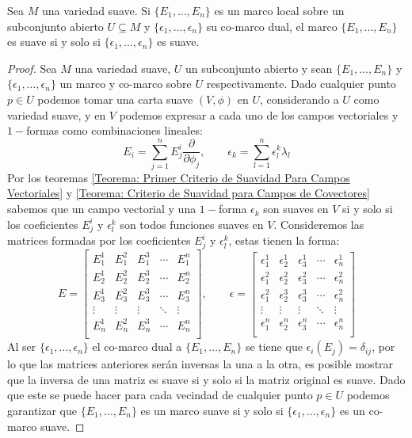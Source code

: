 \begin{lemma}
	Sea $M$ una variedad suave. Si $\{E_1,\ldots,E_n\}$ es un marco local sobre un subconjunto abierto $U \subseteq M$ y $\{\epsilon_1,\ldots,\epsilon_n\}$ su co-marco dual, el marco $\{E_1,\ldots,E_n\}$ es suave si y solo si $\{\epsilon_1,\ldots, \epsilon_n\}$ es suave.
\end{lemma}

\begin{proof}
	Sea $M$ una variedad suave, $U$ un subconjunto abierto y sean $\{E_1, \ldots, E_n\}$ y $\{\epsilon_1,\ldots,\epsilon_n\}$ un marco y co-marco sobre $U$ respectivamente. Dado cualquier punto $p \in U$ podemos tomar una carta suave $(V,\phi)$ en $U$, considerando a $U$ como variedad suave, y en $V$ podemos expresar a cada uno de los campos vectoriales y $1-$formas como combinaciones lineales:
	\[
		E_i = \sum_{j=1}^{n} E_j^i\frac{\partial}{\partial \phi_j},
		\quad\quad
		\epsilon_k = \sum_{l=1}^{n} \epsilon_l^k \lambda_l
	\]
	Por los teoremas \ref{Teorema: Primer Criterio de Suavidad Para Campos Vectoriales} y \ref{Teorema: Criterio de Suavidad para Campos de Covectores} sabemos que un campo vectorial y una $1-$forma $\epsilon_k$ son suaves en $V$ si y solo si los coeficientes $E_j^i$ y $\epsilon_l^k$ son todos funciones suaves en $V$. Consideremos las matrices formadas por los coeficientes $E_j^i$ y $\epsilon_l^k$, estas tienen la forma:
	\[
		E = \begin{bmatrix}
			E_1^1  & E_1^2  & E_1^3  & \cdots & E_1^n  \\[10pt]
			E_2^1  & E_2^2  & E_2^3  & \cdots & E_2^n  \\[10pt]
			E_3^1  & E_3^2  & E_3^3  & \cdots & E_3^n  \\[10pt]
			\vdots & \vdots & \vdots & \ddots & \vdots \\[10pt]
			E_n^1  & E_n^2  & E_n^3  & \cdots & E_n^n  \\[10pt]
		\end{bmatrix},
		\quad\quad
		\epsilon = \begin{bmatrix}
			\epsilon_1^1 & \epsilon_2^1 & \epsilon_3^1 & \cdots & \epsilon_n^1 \\[10pt]
			\epsilon_1^2 & \epsilon_2^2 & \epsilon_3^2 & \cdots & \epsilon_n^2 \\[10pt]
			\epsilon_1^2 & \epsilon_2^3 & \epsilon_3^3 & \cdots & \epsilon_n^2 \\[10pt]
			\vdots       & \vdots       & \vdots       & \ddots & \vdots       \\[10pt]
			\epsilon_1^n & \epsilon_2^n & \epsilon_3^n & \cdots & \epsilon_n^n \\[10pt]
		\end{bmatrix}
	\]
	Al ser  $\{\epsilon_1,\ldots,\epsilon_n\}$ el co-marco dual a $\{E_1,\ldots,E_n\}$ se tiene que $\epsilon_i(E_j) = \delta_{ij}$, por lo que las matrices anteriores serán inversas la una a la otra, es posible mostrar que la inversa de una matriz es suave si y solo si la matriz original es suave. Dado que este se puede hacer para cada vecindad de cualquier punto $p \in U$ podemos garantizar que $\{E_1,\ldots,E_n\}$ es un marco suave si y solo si $\{\epsilon_1,\ldots,\epsilon_n\}$ es un co-marco suave.
\end{proof}

